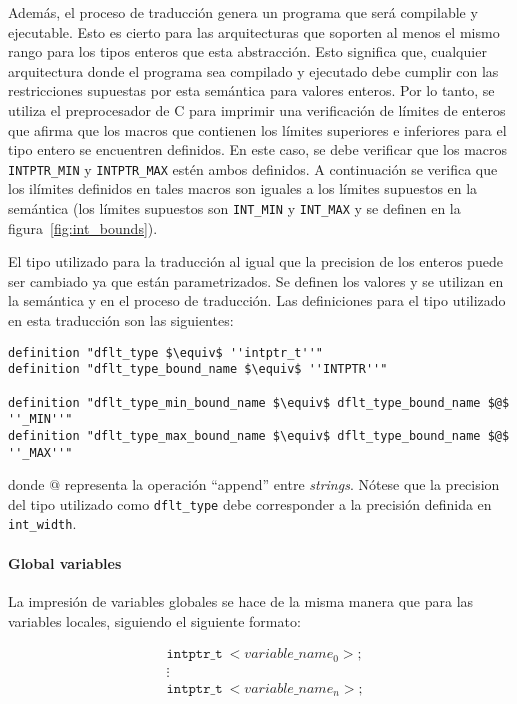 Además, el proceso de traducción genera un programa que será compilable y ejecutable.
Esto es cierto para las arquitecturas que soporten al menos el mismo rango para los tipos enteros que esta abstracción.
Esto significa que, cualquier arquitectura donde el programa sea compilado y ejecutado debe cumplir con las restricciones supuestas por esta semántica para valores enteros.
Por lo tanto, se utiliza el preprocesador de C para imprimir una verificación de límites de enteros que afirma que los macros que contienen los límites superiores e inferiores para el tipo entero se encuentren definidos.
En este caso, se debe verificar que los macros \verb|INTPTR_MIN| y \verb|INTPTR_MAX| estén ambos definidos.
A continuación se verifica que los ilímites definidos en tales macros son iguales a los límites supuestos en la semántica (los límites supuestos son \verb|INT_MIN| y \verb|INT_MAX| y se definen en la figura~\ref{fig:int_bounds}).


El tipo utilizado para la traducción al igual que la precision de los enteros puede ser cambiado ya que están parametrizados.
Se definen los valores y se utilizan en la semántica y en el proceso de traducción.
Las definiciones para el tipo utilizado en esta traducción son las siguientes:

\begin{lstlisting}[frame=single, mathescape=true]
definition "dflt_type $\equiv$ ''intptr_t''"
definition "dflt_type_bound_name $\equiv$ ''INTPTR''"

definition "dflt_type_min_bound_name $\equiv$ dflt_type_bound_name $@$ ''_MIN''"
definition "dflt_type_max_bound_name $\equiv$ dflt_type_bound_name $@$ ''_MAX''"
\end{lstlisting}

donde $@$ representa la operación ``append'' entre \textit{strings}.
Nótese que la precision del tipo utilizado como \verb|dflt_type| debe corresponder a la precisión definida en \verb|int_width|.

\paragraph*{Global variables}

La impresión de variables globales se hace de la misma manera que para las variables locales, siguiendo el siguiente formato:

\begin{equation*}
\begin{split}
& \mathtt{intptr\_t}\ <variable\_name_0>; \\
& \vdots \\
& \mathtt{intptr\_t}\ <variable\_name_n>; \\
\end{split}
\end{equation*}

